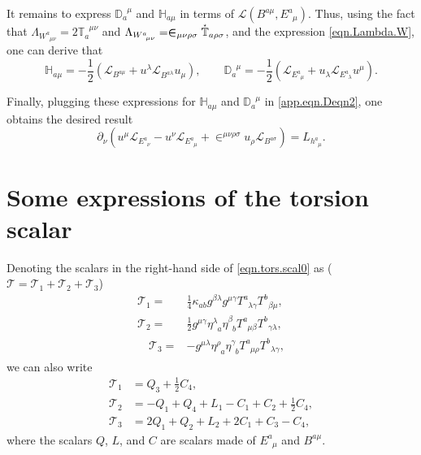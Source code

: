 \documentclass[
10pt, %
a4paper, %
oneside, %
headinclude,footinclude, %
BCOR5mm, %
]{scrartcl}
\newcommand{\mg}[1]{\kappa_{#1}}			%
\newcommand{\tetrsymbol}{h}
\newcommand{\itetrsymbol}{\eta}
\newcommand{\itetr}[2]{\itetrsymbol^{#1}_{\phantom{#1}#2}}
\newcommand{\tetr}[2]{\tetrsymbol^{#1}_{\phantom{#1}#2}}
\newcommand{\D}[1]{\partial_{#1}} %
\newcommand{\Tors}[2]{T^{#1}_{\phantom{a}#2}}
\newcommand{\ET}[2]{E^{#1}_{\phantom{#1}#2}}	%
\newcommand{\BT}[2]{B^{#1#2}}	%
\newcommand{\w}[2]{W^{#1}_{\phantom{#1}#2}}
\newcommand{\Lag}{\Lambda}	%
\newcommand{\Laghodge}{L}%
\newcommand{\LagBE}{\mathcal{L}}%
\newcommand{\LCsymb}{\bm{\in}}    %
\newcommand{\TorsConj}[2]{\mathbb{T}_{#1}^{\phantom{#1}#2}}
\newcommand{\HTConj}[1]{\accentset{\star}{\mathbb{T}}_{#1}}
\newcommand{\Dbb}[2]{\mathbb{D}_{#1}^{\phantom{#1}#2}}
\newcommand{\Hbb}[2]{\mathbb{H}_{#1#2}}
\newcommand{\Tscal}{\mathcal{T}}		%
\begin{document}
It remains to express $ \Dbb{a}{\mu} $ and $ \Hbb{a}{\mu} $ in terms of $ 
\LagBE(\BT{a}{\mu},\ET{a}{\mu}) $. Thus, using the fact that $ \Lag_{\w{a}{\mu\nu}} = 2 
\TorsConj{a}{\mu\nu} $ and $ \Lag_{\w{a}{\mu\nu}} = \LCsymb_{\mu\nu\rho\sigma} \HTConj{a\rho\sigma} 
$,  and the expression \eqref{eqn.Lambda.W}, one can derive that
\begin{equation}%
	\Hbb{a}{\mu} =-\frac12 \left( \LagBE_{\BT{a}{\mu}} + u^\lambda \LagBE_{\BT{a}{\lambda}} u_\mu 
	\right),
	\qquad
	 \Dbb{a}{\mu} =-\frac12 \left( \LagBE_{\ET{a}{\mu}} + u_\lambda \LagBE_{\ET{a}{\lambda}} u^\mu 
	 \right).
\end{equation}

Finally, plugging these expressions for $ \Hbb{a}{\mu} $ and $ \Dbb{a}{\mu} $ in 
\eqref{app.eqn.Deqn2}, one obtains the desired result 
\begin{equation}
	\D{\nu}( u^\mu\LagBE_{\ET{a}{\nu}} - u^\nu \LagBE_{\ET{a}{\mu}} + 
	\LCsymb^{\mu\nu\rho\sigma}u_\rho\LagBE_{\BT{a}{\sigma}}) 
	= \Laghodge_{\tetr{a}{\mu}}.
\end{equation}



\section{Some expressions of the torsion scalar}

Denoting the scalars in the right-hand side of \eqref{eqn.tors.scal0} as ($ \Tscal = \Tscal_1 + 
\Tscal_2 + \Tscal_3 $)
\begin{align}\label{eqn.tors.scal}
	\Tscal_1 = & \frac14 \mg{ab}g^{\beta\lambda }g^{\mu\gamma 
	}\Tors{a}{\lambda\gamma} \Tors{b}{\beta\mu },\\[2mm]
	\Tscal_2 = & \frac12 g^{\mu\gamma} \itetr{\lambda}{a} \itetr{\beta}{b} \Tors{a}{\mu\beta} 
	\Tors{b}{\gamma\lambda},\\[2mm]
	\quad
	\Tscal_3 = & -g^{\mu\lambda} \itetr{\rho}{a} \itetr{\gamma}{b} \Tors{a}{\mu\rho} 
	\Tors{b}{\lambda\gamma},	  
\end{align}
we can also write 
\begin{align}\label{eqn.tors.scal.TQLC}
	\mathcal{T}_1 &= Q_3 + \frac12 C_4, \\
	\mathcal{T}_2 &=- Q_1 + Q_4 + L_1 -C_1 + C_2 + \frac12 C_4, \\[2mm]
	\mathcal{T}_3 &= 2 Q_1 + Q_2 + L_2 + 2 C_1 + C_3 - C_4,
\end{align}
where the scalars $ Q $, $ L $, and $ C $ are scalars made of $ \ET{a}{\mu} $ and 
$ \BT{a}{\mu} $.
\end{document}
